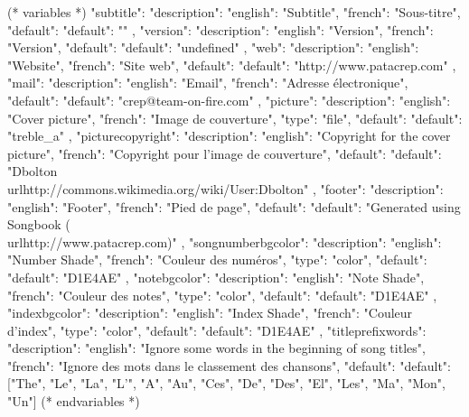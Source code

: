 

(* variables *)
{
"subtitle": {"description": {"english": "Subtitle", "french": "Sous-titre"},
            "default": {"default": ""}
            },
"version":{ "description": {"english": "Version", "french": "Version"},
            "default": {"default": "undefined"}
         },
"web": {"description": {"english": "Website", "french": "Site web"},
         "default": {"default": "http://www.patacrep.com"}
      },
"mail": {"description": {"english": "Email", "french": "Adresse électronique"},
         "default": {"default": "crep@team-on-fire.com"}
      },
"picture": {"description": {"english": "Cover picture", "french": "Image de couverture"},
            "type": "file",
            "default": {"default": "treble_a"}
         },
"picturecopyright": {"description": {"english": "Copyright for the cover picture", "french": "Copyright pour l'image de couverture"},
                     "default": {"default": "Dbolton \\url{http://commons.wikimedia.org/wiki/User:Dbolton}"}
                  },
"footer": {"description": {"english": "Footer", "french": "Pied de page"},
           "default": {"default": "Generated using Songbook (\\url{http://www.patacrep.com})"}
        },
"songnumberbgcolor": {"description": {"english": "Number Shade", "french": "Couleur des numéros"},
                     "type": "color",
                     "default": {"default": "D1E4AE"}
                  },
"notebgcolor": {"description": {"english": "Note Shade", "french": "Couleur des notes"},
               "type": "color",
               "default": {"default": "D1E4AE"}
            },
"indexbgcolor": {"description": {"english": "Index Shade", "french": "Couleur d'index"},
               "type": "color",
               "default": {"default": "D1E4AE"}
            },
"titleprefixwords": {"description": {"english": "Ignore some words in the beginning of song titles",
                                     "french": "Ignore des mots dans le classement des chansons"},
                     "default": {"default": ["The", "Le", "La", "L'", "A", "Au", "Ces", "De",
                     						 "Des", "El", "Les", "Ma", "Mon", "Un"]}
                     }
}
(* endvariables *)

